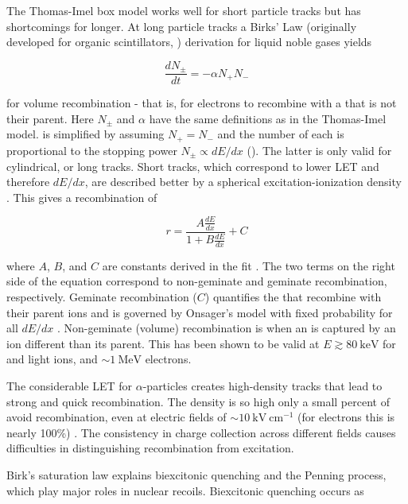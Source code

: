 The Thomas-Imel box model works well for short particle tracks but has shortcomings for longer.  At long particle tracks a Birks'
Law (originally developed for organic scintillators, ) derivation for liquid noble gases yields

\begin{equation}
\frac{dN_{\pm}}{dt} = -\alpha N_{+} N_{-}
\label{eq:birks_diff}
\end{equation}

\noindent for volume recombination - that is, for electrons to recombine with a  that is not their parent.  Here $N_{\pm}$ and
$\alpha$ have the same definitions as in the Thomas-Imel model.   is simplified by assuming
$N_{+} = N_{-}$ and the number of each is proportional to the stopping power $N_{\pm} \propto dE/dx$
().  The latter is only valid for
cylindrical, or long tracks.  Short tracks, which correspond to lower LET and therefore $dE/dx$, are described better by a spherical
excitation-ionization density .  This gives a recombination of

\begin{equation}
r = \frac{A \frac{dE}{dx}}{1 + B \frac{dE}{dx}} + C
\label{eq:birks_recomb}
\end{equation}

\noindent where $A$, $B$, and $C$ are constants derived in the fit .  The two terms on the right side of the equation
correspond to
non-geminate and geminate recombination, respectively.  Geminate recombination ($C$) quantifies the
\electron that recombine with their parent ions and is governed by Onsager's model with fixed probability for all $dE/dx$
.  Non-geminate
(volume) recombination is when an \electron is captured by an ion different than its parent.  This has been shown to be valid at
$E \gtrsim 80\ \mathrm{keV}$ for \gammarays and light ions, and ${\sim} 1\ \mathrm{MeV}$ electrons.

The considerable LET for $\alpha$-particles creates high-density tracks that lead to strong and quick recombination.  The
density is so high only a small percent of \electron avoid recombination, even at electric fields of
${\sim} 10\ \mathrm{kV\ cm^{-1}}$
(for electrons this is nearly 100\%) .  The consistency in charge collection across different fields causes
difficulties in distinguishing recombination from excitation.

Birk's saturation law explains biexcitonic quenching and the Penning process, which play major roles in nuclear recoils.  Biexcitonic
quenching occurs as

